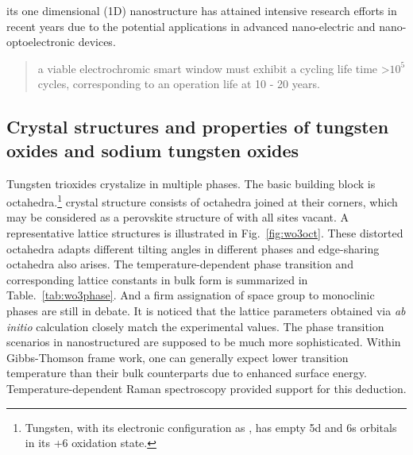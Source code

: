 its one dimensional (1D) nanostructure has attained intensive research efforts in recent years due to the potential applications in advanced nano-electric and nano-optoelectronic devices.

\begin{quote}
a viable electrochromic smart window must exhibit a cycling life time \textgreater $10^5$ cycles, corresponding to an operation life at 10 - 20 years.
\end{quote}






\subsection{Crystal structures and properties of tungsten oxides and sodium tungsten oxides}\label{sec:wonawo}

\textbf{} Tungsten trioxides crystalize in multiple phases. The basic building block is  octahedra.\footnote{Tungsten, with its electronic configuration as , has empty 5d and 6s orbitals in its +6 oxidation state.}  crystal structure consists of  octahedra joined at their corners, which may be considered as a perovskite structure of  with all  sites vacant. A representative lattice structures is illustrated in Fig.~\ref{fig:wo3oct}. These distorted  octahedra adapts different tilting angles in different phases and edge-sharing octahedra also arises. The temperature-dependent phase transition and corresponding lattice constants in bulk form is summarized in Table.~\ref{tab:wo3phase}.\cite{Zheng2011} And a firm assignation of space group to monoclinic phases are still in debate.\cite{Chatten2005} It is noticed that the lattice parameters obtained via \emph{ab initio} calculation closely match the experimental values.\cite{Migas2010a} The phase transition scenarios in nanostructured  are supposed to be much more sophisticated. Within Gibbs-Thomson frame work, one can generally expect lower transition temperature than their bulk counterparts due to enhanced surface energy. Temperature-dependent Raman spectroscopy provided support for this deduction.\cite{Boulova2002}

